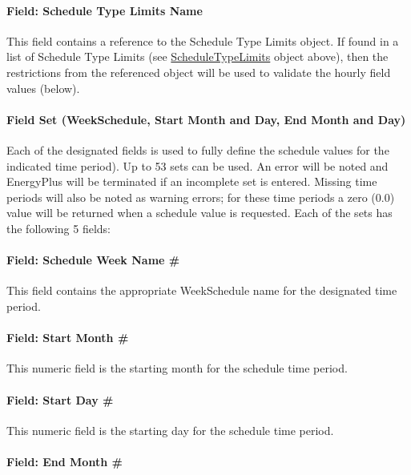 \paragraph{Field: Schedule Type Limits Name}\label{field-schedule-type-limits-name-3}

This field contains a reference to the Schedule Type Limits object. If found in a list of Schedule Type Limits (see \hyperref[scheduletypelimits]{ScheduleTypeLimits} object above), then the restrictions from the referenced object will be used to validate the hourly field values (below).

\paragraph{Field Set (WeekSchedule, Start Month and Day, End Month and Day)}\label{field-set-weekschedule-start-month-and-day-end-month-and-day}

Each of the designated fields is used to fully define the schedule values for the indicated time period). Up to 53 sets can be used. An error will be noted and EnergyPlus will be terminated if an incomplete set is entered. Missing time periods will also be noted as warning errors; for these time periods a zero (0.0) value will be returned when a schedule value is requested. Each of the sets has the following 5 fields:

\paragraph{Field: Schedule Week Name \#}\label{field-schedule-week-name}

This field contains the appropriate WeekSchedule name for the designated time period.

\paragraph{Field: Start Month \#}\label{field-start-month}

This numeric field is the starting month for the schedule time period.

\paragraph{Field: Start Day \#}\label{field-start-day}

This numeric field is the starting day for the schedule time period.

\paragraph{Field: End Month \#}\label{field-end-month-000}

